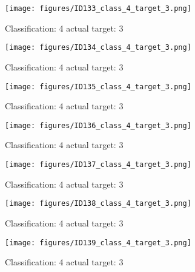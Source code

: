 \begin{figure}[h!]
\begin{center}
\texttt{[image: figures/ID133\_class\_4\_target\_3.png]}
\end{center}
\caption{ Classification: 4 actual target: 3}
\label{fig:ID133_class_4_target_3}
\end{figure}
\begin{figure}[h!]
\begin{center}
\texttt{[image: figures/ID134\_class\_4\_target\_3.png]}
\end{center}
\caption{ Classification: 4 actual target: 3}
\label{fig:ID134_class_4_target_3}
\end{figure}
\begin{figure}[h!]
\begin{center}
\texttt{[image: figures/ID135\_class\_4\_target\_3.png]}
\end{center}
\caption{ Classification: 4 actual target: 3}
\label{fig:ID135_class_4_target_3}
\end{figure}
\begin{figure}[h!]
\begin{center}
\texttt{[image: figures/ID136\_class\_4\_target\_3.png]}
\end{center}
\caption{ Classification: 4 actual target: 3}
\label{fig:ID136_class_4_target_3}
\end{figure}
\begin{figure}[h!]
\begin{center}
\texttt{[image: figures/ID137\_class\_4\_target\_3.png]}
\end{center}
\caption{ Classification: 4 actual target: 3}
\label{fig:ID137_class_4_target_3}
\end{figure}
\begin{figure}[h!]
\begin{center}
\texttt{[image: figures/ID138\_class\_4\_target\_3.png]}
\end{center}
\caption{ Classification: 4 actual target: 3}
\label{fig:ID138_class_4_target_3}
\end{figure}
\begin{figure}[h!]
\begin{center}
\texttt{[image: figures/ID139\_class\_4\_target\_3.png]}
\end{center}
\caption{ Classification: 4 actual target: 3}
\label{fig:ID139_class_4_target_3}
\end{figure}
